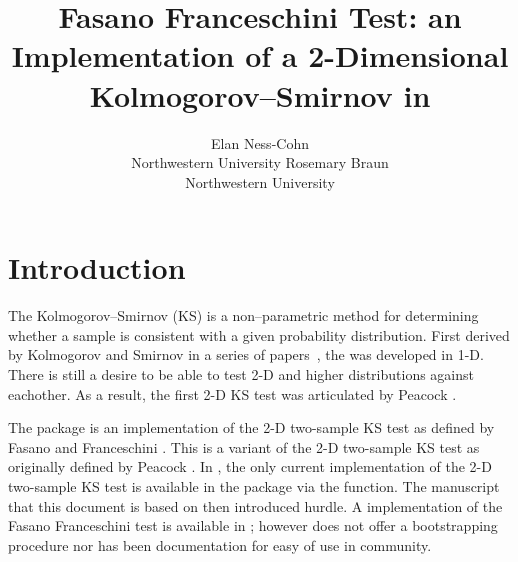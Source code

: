 \documentclass[codesnippet]{jss}
\author{Elan Ness-Cohn\\Northwestern University
   \And Rosemary Braun\\Northwestern University}
\title{Fasano Franceschini Test: an Implementation of a 2-Dimensional Kolmogorov--Smirnov in \proglang{R}}
\newcommand{\fct}[1]{\code{#1()}}
\begin{document}


\section[Introduction]{Introduction} \label{sec:intro}


The Kolmogorov--Smirnov (KS) is a non--parametric method for determining whether a sample is consistent with a given probability distribution. First derived by Kolmogorov and Smirnov in a series of papers~\citep{Kolmogorov1933,Kolmogorov1933a,Smirnov1936,Smirnov1937,Smirnov1939,Smirnov1944,Smirnov1948}, the was developed in 1-D. There is still a desire to be able to test 2-D and higher distributions against eachother. As a result, the first 2-D KS test was articulated by Peacock \citep{Peacock1983}.

The  package is an  implementation of the 2-D two-sample KS test as defined by Fasano and Franceschini \citep{Fasano1987}. This is a variant of the 2-D two-sample KS test as originally defined by Peacock \citep{Peacock1983}. In  \citep{R}, the only current implementation of the 2-D two-sample KS test is available in the  package via the \fct{peacock2} function. The manuscript that this document is based on \citep{Fasano1987} then introduced hurdle. A  implementation of the Fasano Franceschini test is available in \citep{numericalRecipes}; however does not offer a bootstrapping procedure nor has been documentation for easy of use in  community.
\end{document}
